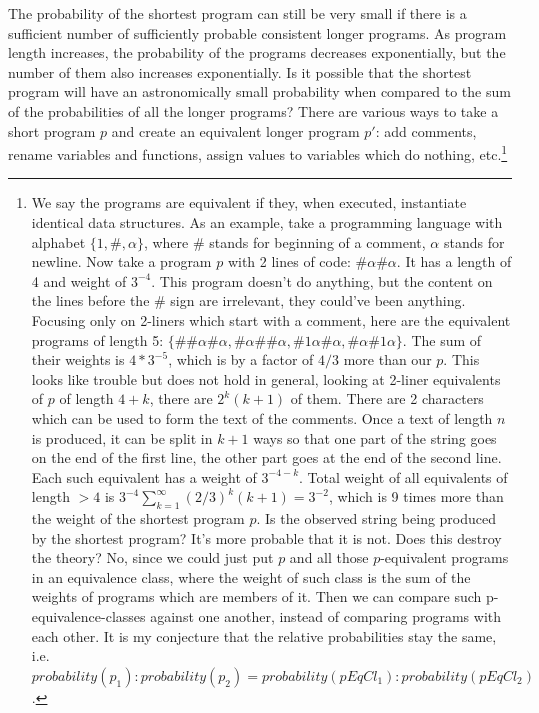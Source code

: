 \documentclass[oneside,hidelinks]{article}
\begin{document}
The probability of the shortest program can still be very small if there is a sufficient number of sufficiently probable consistent longer programs.
As program length increases, the probability of the programs decreases exponentially, but the number of them also increases exponentially.
Is it possible that the shortest program will have an astronomically small probability when compared to the sum of the probabilities of all the longer programs?
There are various ways to take a short program $p$ and create an equivalent longer program $p'$: add comments, rename variables and functions, assign values to variables which do nothing, etc.\footnote{
We say the programs are equivalent if they, when executed, instantiate identical data structures.
As an example, take a programming language with alphabet $\{1,\#,\alpha\}$, where \# stands for beginning of a comment, $\alpha$ stands for newline.
Now take a program $p$ with 2 lines of code: $\#\alpha\#\alpha$.
It has a length of 4 and weight of $3^{-4}$.
This program doesn't do anything, but the content on the lines before the \# sign are irrelevant, they could've been anything.
Focusing only on 2-liners which start with a comment, here are the equivalent programs of length 5: $\{\#\#\alpha\#\alpha, \#\alpha\#\#\alpha, \#1\alpha\#\alpha, \#\alpha\#1\alpha\}$.
The sum of their weights is $4 * 3^{-5}$, which is by a factor of $4/3$ more than our $p$.
This looks like trouble but does not hold in general, looking at 2-liner equivalents of $p$ of length $4+k$, there are $2^k(k+1)$ of them.
There are 2 characters which can be used to form the text of the comments.
Once a text of length $n$ is produced, it can be split in $k+1$ ways so that one part of the string goes on the end of the first line, the other part goes at the end of the second line.
Each such equivalent has a weight of $3^{-4-k}$.
Total weight of all equivalents of length $>4$ is $3^{-4} \sum_{k=1}^{\infty} (2/3)^k(k+1) = 3^{-2}$, which is 9 times more than the weight of the shortest program $p$.
Is the observed string being produced by the shortest program?
It's more probable that it is not.
Does this destroy the theory?
No, since we could just put $p$ and all those $p$-equivalent programs in an equivalence class, where the weight of such class is the sum of the weights of programs which are members of it.
Then we can compare such p-equivalence-classes against one another, instead of comparing programs with each other.
It is my conjecture that the relative probabilities stay the same, i.e. $probability(p_1):probability(p_2)=probability(pEqCl_1):probability(pEqCl_2)$.
}
\end{document}

